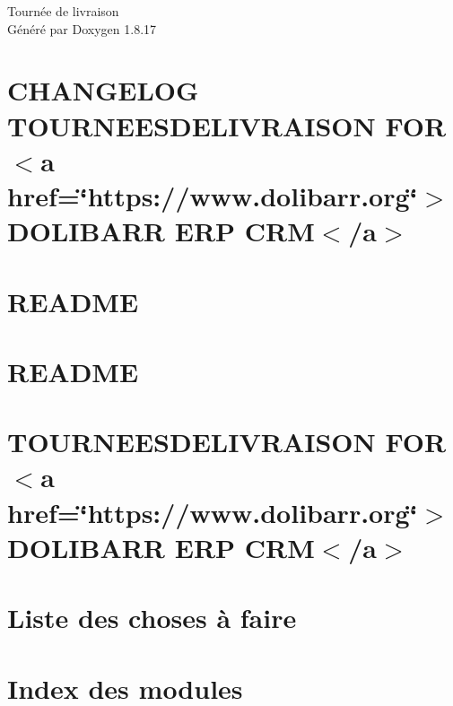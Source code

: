 \let\mypdfximage\pdfximage\def\pdfximage{\immediate\mypdfximage}\documentclass[twoside]{book}
\newcommand{\+}{\discretionary{\mbox{\scriptsize$\hookleftarrow$}}{}{}}
\newcommand{\clearemptydoublepage}{%
  \newpage{\pagestyle{empty}\cleardoublepage}%
}
\begin{document}
\hypersetup{pageanchor=false,
             bookmarksnumbered=true,
             pdfencoding=unicode
            }
\begin{titlepage}
\vspace*{7cm}
\begin{center}%
{\Large Tournée de livraison }\\
\vspace*{1cm}
{\large Généré par Doxygen 1.8.17}\\
\end{center}
\end{titlepage}
\clearemptydoublepage
{}
\tableofcontents
\clearemptydoublepage
{}
\hypersetup{pageanchor=true}

\chapter{C\+H\+A\+N\+G\+E\+L\+OG T\+O\+U\+R\+N\+E\+E\+S\+D\+E\+L\+I\+V\+R\+A\+I\+S\+ON F\+OR $<$a href=\char`\"{}https\+://www.\+dolibarr.\+org\char`\"{}$>$D\+O\+L\+I\+B\+A\+RR E\+RP C\+RM$<$/a$>$}
\label{md_ChangeLog}

\chapter{R\+E\+A\+D\+ME}
\label{md_core_boxes_README}

\chapter{R\+E\+A\+D\+ME}
\label{md_core_triggers_README}

\chapter{T\+O\+U\+R\+N\+E\+E\+S\+D\+E\+L\+I\+V\+R\+A\+I\+S\+ON F\+OR $<$a href=\char`\"{}https\+://www.\+dolibarr.\+org\char`\"{}$>$D\+O\+L\+I\+B\+A\+RR E\+RP C\+RM$<$/a$>$}
\label{md_README}

\chapter{Liste des choses à faire}
\label{todo}

\chapter{Index des modules}

\end{document}
